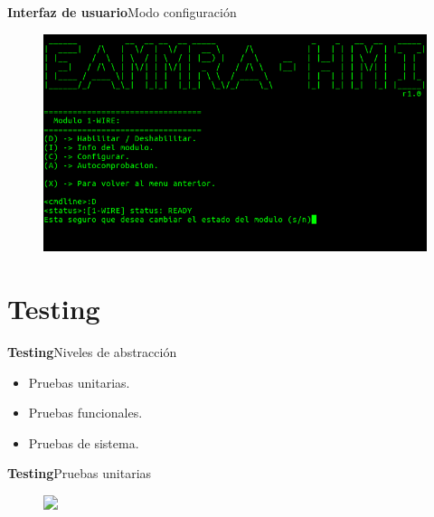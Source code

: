 \documentclass[11pt, xcolor={table,xcdraw}]{beamer}
\begin{document}
\begin{frame}{\textbf{\LARGE{Interfaz de usuario}}}{Modo configuración}
	\vspace{-.7cm}
	\centering
	\begin{figure}[H]
		\includegraphics[width=\textwidth]{./imagenes/interfaz_config_detalle.png}
	\end{figure}	
\end{frame}


\section{Testing}

\begin{frame}{\textbf{\LARGE{Testing}}}{Niveles de abstracción}
  \fontsize{18pt}{18}\selectfont
	\centering
	\begin{itemize}
		\item Pruebas unitarias.
		\vspace{20px}
		\item Pruebas funcionales.
		\vspace{20px}
		\item Pruebas de sistema.
	\end{itemize}
\end{frame}

\begin{frame}{\textbf{\LARGE{Testing}}}{Pruebas unitarias}
	\vspace{-.7cm}
	\begin{figure}[H]
		\includegraphics<1>[width=1\textwidth]{./imagenes/TestUnitario.png}
	\end{figure}	
\end{frame}
\end{document}
